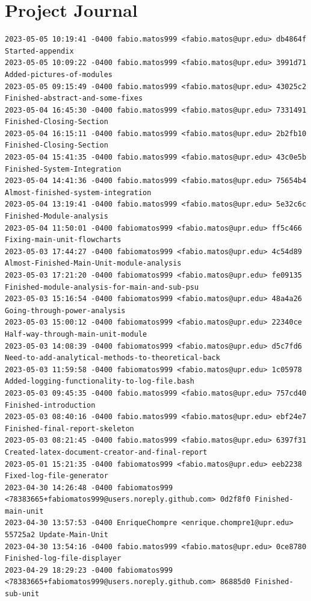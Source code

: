 \documentclass[12pt]{article}
\begin{document}
\section{Project Journal}
\begin{verbatim}
2023-05-05 10:19:41 -0400 fabio.matos999 <fabio.matos@upr.edu> db4864f Started-appendix
2023-05-05 10:09:22 -0400 fabio.matos999 <fabio.matos@upr.edu> 3991d71 Added-pictures-of-modules
2023-05-05 09:15:49 -0400 fabio.matos999 <fabio.matos@upr.edu> 43025c2 Finished-abstract-and-some-fixes
2023-05-04 16:45:30 -0400 fabio.matos999 <fabio.matos@upr.edu> 7331491 Finished-Closing-Section
2023-05-04 16:15:11 -0400 fabio.matos999 <fabio.matos@upr.edu> 2b2fb10 Finished-Closing-Section
2023-05-04 15:41:35 -0400 fabio.matos999 <fabio.matos@upr.edu> 43c0e5b Finished-System-Integration
2023-05-04 14:41:36 -0400 fabio.matos999 <fabio.matos@upr.edu> 75654b4 Almost-finished-system-integration
2023-05-04 13:19:41 -0400 fabio.matos999 <fabio.matos@upr.edu> 5e32c6c Finished-Module-analysis
2023-05-04 11:50:01 -0400 fabiomatos999 <fabio.matos@upr.edu> ff5c466 Fixing-main-unit-flowcharts
2023-05-03 17:44:27 -0400 fabiomatos999 <fabio.matos@upr.edu> 4c54d89 Almost-Finished-Main-Unit-module-analysis
2023-05-03 17:21:20 -0400 fabiomatos999 <fabio.matos@upr.edu> fe09135 Finished-module-analysis-for-main-and-sub-psu
2023-05-03 15:16:54 -0400 fabiomatos999 <fabio.matos@upr.edu> 48a4a26 Going-through-power-analysis
2023-05-03 15:00:12 -0400 fabiomatos999 <fabio.matos@upr.edu> 22340ce Half-way-through-main-unit-module
2023-05-03 14:08:39 -0400 fabiomatos999 <fabio.matos@upr.edu> d5c7fd6 Need-to-add-analytical-methods-to-theoretical-back
2023-05-03 11:59:58 -0400 fabiomatos999 <fabio.matos@upr.edu> 1c05978 Added-logging-functionality-to-log-file.bash
2023-05-03 09:45:35 -0400 fabio.matos999 <fabio.matos@upr.edu> 757cd40 Finished-introduction
2023-05-03 08:40:16 -0400 fabio.matos999 <fabio.matos@upr.edu> ebf24e7 Finished-final-report-skeleton
2023-05-03 08:21:45 -0400 fabio.matos999 <fabio.matos@upr.edu> 6397f31 Created-latex-document-creator-and-final-report
2023-05-01 15:21:35 -0400 fabiomatos999 <fabio.matos@upr.edu> eeb2238 Fixed-log-file-generator
2023-04-30 14:26:48 -0400 fabiomatos999 <78383665+fabiomatos999@users.noreply.github.com> 0d2f8f0 Finished-main-unit
2023-04-30 13:57:53 -0400 EnriqueChompre <enrique.chompre1@upr.edu> 55725a2 Update-Main-Unit
2023-04-30 13:54:16 -0400 fabio.matos999 <fabio.matos@upr.edu> 0ce8780 Finished-log-file-displayer
2023-04-29 18:29:23 -0400 fabiomatos999 <78383665+fabiomatos999@users.noreply.github.com> 86885d0 Finished-sub-unit

\end{verbatim}
\end{document}

